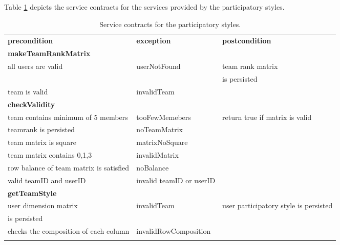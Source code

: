 Table \ref{tab:mbti_serviceContract} depicts the service contracts for the services provided by the participatory styles.

\begin{table}[htb]
\caption{Service contracts for the participatory styles. \label{tab:mbti_serviceContract}}

\begin{tabular}{l l l}
\hline
\noalign{\smallskip}
\textbf{precondition}&\textbf{exception} &\textbf{postcondition}\\
\noalign{\smallskip}
\hline
\noalign{\smallskip}
\textbf{makeTeamRankMatrix}\\
all users are valid & userNotFound & team rank matrix \\
&&is persisted \\team is valid & invalidTeam&\\
\noalign{\smallskip}
\textbf{checkValidity}\\
team contains minimum of 5 members & tooFewMemebers & return true if matrix is valid \\teamrank is persisted & noTeamMatrix &  \\team matrix is square&matrixNoSquare&\\team matrix contains 0,1,3& invalidMatrix&\\row balance of team matrix is satisfied& noBalance&\\valid teamID and userID&invalid teamID or userID&\\

\noalign{\smallskip}
\textbf{getTeamStyle}\\
user dimension matrix & invalidTeam & user participatory style is persisted\\
is persisted \\checks the composition of each column&invalidRowComposition&\\
\noalign{\smallskip}

\noalign{\smallskip}
\hline
\end{tabular}  
\end{table}
 